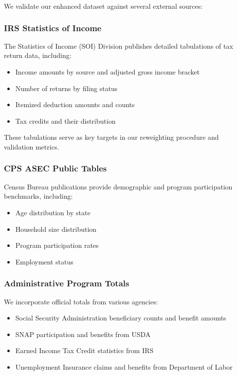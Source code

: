 We validate our enhanced dataset against several external sources:

\subsubsection{IRS Statistics of Income}

The Statistics of Income (SOI) Division publishes detailed tabulations of tax return data, including:
\begin{itemize}
    \item Income amounts by source and adjusted gross income bracket
    \item Number of returns by filing status
    \item Itemized deduction amounts and counts
    \item Tax credits and their distribution
\end{itemize}

These tabulations serve as key targets in our reweighting procedure and validation metrics.

\subsubsection{CPS ASEC Public Tables}

Census Bureau publications provide demographic and program participation benchmarks, including:
\begin{itemize}
    \item Age distribution by state
    \item Household size distribution
    \item Program participation rates
    \item Employment status
\end{itemize}

\subsubsection{Administrative Program Totals}

We incorporate official totals from various agencies:
\begin{itemize}
    \item Social Security Administration beneficiary counts and benefit amounts
    \item SNAP participation and benefits from USDA
    \item Earned Income Tax Credit statistics from IRS
    \item Unemployment Insurance claims and benefits from Department of Labor
\end{itemize}

